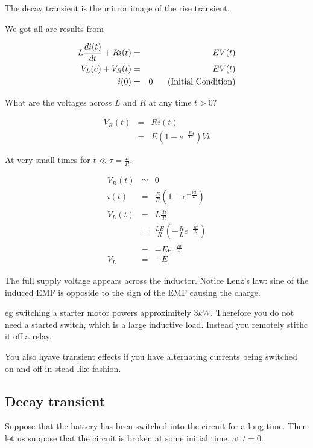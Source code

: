 \documentclass[a4paper,12pt]{article}
\begin{document}
The decay transient is the mirror image of the rise transient.

We got all are results from

\begin{eqnarray*}
L \frac{di(t)}{dt} + R i(t) & = & E V(t) \\
V_{L} (e) + V_{R}(t) & = & E V(t) \\
i(0) & = & 0 \mbox{\hspace{5mm} (Initial Condition)} \\
\end{eqnarray*}


What are the voltages across $L$ and $R$ at any time $t > 0$?

\begin{eqnarray*}
V_{R}(t) & = & R i(t) \\
			& = & E \left( 1 - e^{- \frac{R}{L} t} \right) V t
\end{eqnarray*}			


At very small times for $t \ll \tau = \frac{L}{R}$.

\begin{eqnarray*}
V_{R}(t) & \simeq & 0 \\
i(t) & = & \frac{E}{R} \left(1 - e^{- \frac{R t}{L}} \right) \\
V_{L}(t) & = & L \frac{di}{dt} \\
			& = & \frac{LE}{R} \left(- \frac{R}{L} e^{- \frac{R t}{L}}
			\right) \\
			& = & - E e^{- \frac{R t}{L}} \\
V_{L}		& = & - E
\end{eqnarray*}

The full supply voltage appears across the inductor. Notice Lenz's
law: sine of the induced EMF is opposide to the sign of the EMF causing
the charge.

eg switching a starter motor powers approximitely $3kW$. Therefore you
do not need a started switch, which is a large inductive load. Instead
you remotely stithc it off a relay.

You also hyave transient effects if you have alternating currents being
switched on and off in stead like fashion.

\subsection{Decay transient}

Suppose that the battery has been switched into the circuit for a long
time. Then let us suppose that the circuit is broken at some initial
time, at $t = 0$.
\end{document}
